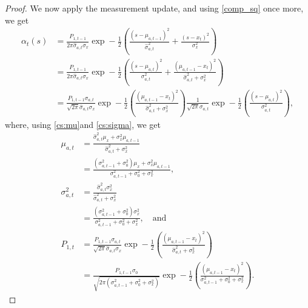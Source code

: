 \documentclass[12pt,leqno]{article}
\begin{document}
\begin{proof}
We now apply the measurement update, and using \eqref{comp_sq} once more, we get
\begin{align*}
  \alpha_t(s) &= \frac{P_{1,t-1}}{2\pi\hat{\sigma}_{a,t}\sigma_x}
  \exp-\frac{1}{2}\left(\frac{(s-\mu_{a,t-1})^2}{\hat{\sigma}_{a,t}^2} + \frac{(s-x_t)^2}{\sigma_x^2}\right)\\
  &= \frac{P_{1,t-1}}{2\pi\hat{\sigma}_{a,t}\sigma_x}
  \exp-\frac{1}{2}\left(\frac{(s-\mu_{a,t})^2}{\sigma_{a,t}^2 } +
  \frac{(\mu_{a,t-1}-x_t)^2}{\hat{\sigma}_{a,t}^2 +\sigma_x^2}\right)\\
  &= \frac{P_{1,t-1}\sigma_{a,t}}{\sqrt{2\pi}\hat{\sigma}_{a,t}\sigma_x}\exp-\frac{1}{2}\left(\frac{(\mu_{a,t-1}-x_t)^2}{\hat{\sigma}_{a,t}^2 +\sigma_x^2}\right)\frac{1}{\sqrt{2\pi}\sigma_{a,t}}\exp-\frac{1}{2}\left(\frac{(s-\mu_{a,t})^2}{\sigma_{a,t}^2 }
  \right),
\end{align*}
where, using \eqref{cs:mu}and \eqref{cs:sigma}, we get
\begin{align*}
  \mu_{a,t} &= \frac{\hat{\sigma}_{a,t}^2\mu_x + \sigma_x^2\mu_{a,t-1}}{\hat{\sigma}_{a,t}^2+\sigma_x^2}\\
  &= \frac{(\sigma_{a,t-1}^2+\sigma_0^2)\mu_x + \sigma_x^2\mu_{a,t-1}}{\sigma_{a,t-1}^2+\sigma_0^2+\sigma_x^2}, \\ 
  \sigma_{a,t}^2 &= \frac{\hat{\sigma}_{a,t}^2\sigma_x^2}{\hat{\sigma}_{a,t}^2 + \sigma_x^2} \\
  &= \frac{(\sigma_{a,t-1}^2+\sigma_0^2)\sigma_x^2}{\sigma_{a,t-1}^2+\sigma_0^2+\sigma_x^2}, \quad\text{and}\\
  P_{1,t}&= \frac{P_{1,t-1}\sigma_{a,t}}{\sqrt{2\pi}\hat{\sigma}_{a,t}\sigma_x}\exp-\frac{1}{2}\left(\frac{(\mu_{a,t-1}-x_t)^2}{\hat{\sigma}_{a,t}^2 +\sigma_x^2}\right)\\
  &= \frac{P_{1,t-1}\sigma_0}{\sqrt{2\pi(\sigma_{a,t-1}^2+\sigma_0^2+\sigma_x^2)}}\exp-\frac{1}{2}\left(\frac{(\mu_{a,t-1}-x_t)^2}
    {\sigma_{a,t-1}^2+\sigma_0^2 +\sigma_x^2}\right).
\end{align*}
\end{proof}  
\end{document}
